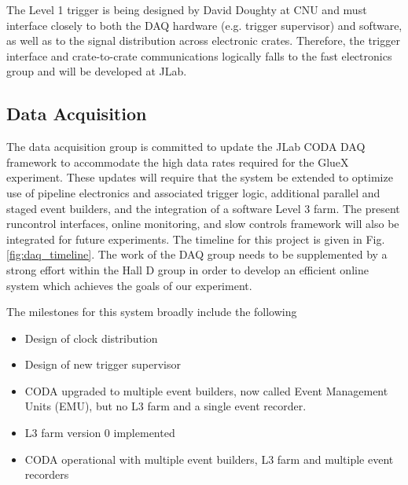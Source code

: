 \documentclass[oneside,12pt,letterpaper]{article}
\begin{document}
The Level 1 trigger is being designed by David Doughty at CNU and
must interface closely to both the DAQ hardware (e.g. trigger
supervisor) and software, as well as to the signal distribution across 
electronic crates. Therefore, the trigger interface and crate-to-crate
communications logically falls
to the fast electronics group and will be developed at JLab.


\subsection{Data Acquisition}
The data acquisition group is committed to update the JLab CODA 
DAQ framework to accommodate the high data rates required
for the GlueX experiment. These updates will require that
the system be extended to optimize use of pipeline electronics and
associated trigger logic, additional parallel and staged
event builders, and the integration of a software Level 3 farm.
The present runcontrol interfaces, online monitoring, and slow
controls framework will also be integrated for future experiments.
The timeline for this project is given in Fig.\,\ref{fig:daq_timeline}.
The work of the DAQ group needs to be supplemented by a strong
effort within the Hall D group in order to develop
an efficient online system which achieves the goals of
our experiment.

The milestones for this system broadly include the following
\begin{itemize}
   \item Design of clock distribution
   \item Design of new trigger supervisor
   \item CODA upgraded to multiple event builders, now called Event Management Units (EMU),
         but no L3 farm and a single event recorder.
   \item L3 farm version 0 implemented
   \item CODA operational with multiple event builders, L3 farm and multiple event recorders 
\end{itemize}
\end{document}
